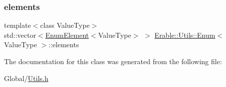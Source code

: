 \subsubsection{\texorpdfstring{elements}{elements}}
{\footnotesize\ttfamily template$<$class Value\+Type$>$ \\
std\+::vector$<$\mbox{\hyperlink{struct_erable_1_1_utils_1_1_enum_element}{Enum\+Element}}$<$Value\+Type$>$ $>$ \mbox{\hyperlink{class_erable_1_1_utils_1_1_enum}{Erable\+::\+Utils\+::\+Enum}}$<$ Value\+Type $>$\+::elements}



The documentation for this class was generated from the following file\+:\begin{DoxyCompactItemize}
\item 
Global/\mbox{\hyperlink{_utils_8h}{Utils.\+h}}\end{DoxyCompactItemize}
